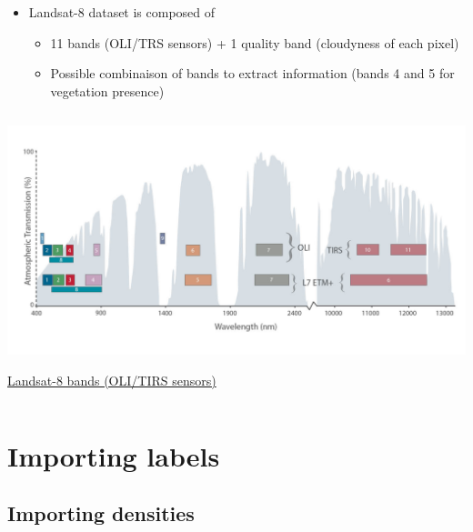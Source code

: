 \documentclass[c]{beamer}
\begin{document}
\begin{frame}
 \begin{itemize}
  \item Landsat-8 dataset is composed of 
  \begin{itemize}
   \item 11 bands (OLI/TRS sensors) + 1 quality band (cloudyness of each pixel)
   \item Possible combinaison of bands to extract information (bands 4 and 5 for vegetation presence)
 \end{itemize}
\end{itemize}
 
\begin{columns}
\begin{column}{0.80\textwidth}
\begin{overlayarea}{\linewidth}{4cm}
  \centering\vfill
  \includegraphics[scale=0.13]{images/bands/landsat8_bands.jpg}
\end{overlayarea}
\begin{overlayarea}{\linewidth}{1cm}
  \centering
  \scriptsize \href{http://landsat.gsfc.nasa.gov/sentinel-2a-launches-our-compliments-our-complements/}{Landsat-8 bands (OLI/TIRS sensors)}\par
\end{overlayarea}
\end{column}
\end{columns}
\end{frame}

\section{Importing labels}
\begin{frame}
\tableofcontents[currentsection]
\end{frame}

\subsection{Importing densities}
\begin{frame}
\tableofcontents[currentsubsection]
\end{frame}
\end{document}
